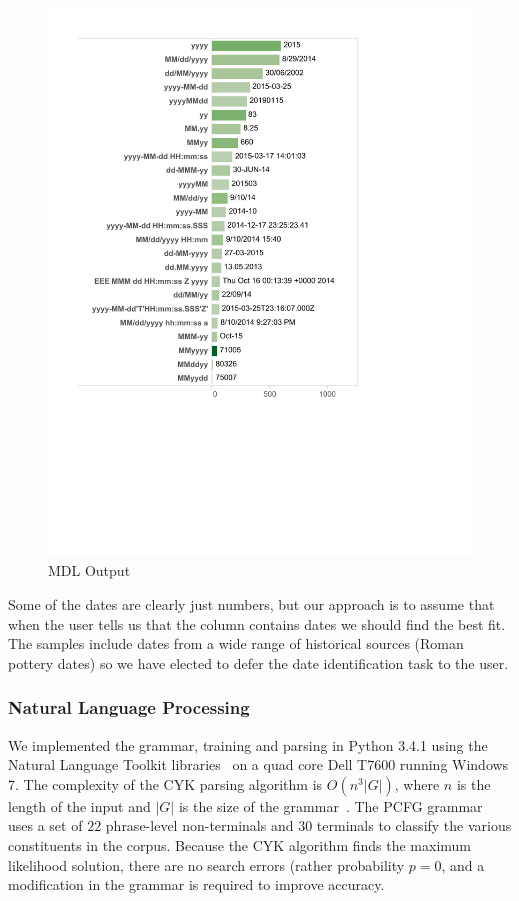\begin{figure}[ht]
\centering
\includegraphics[width=\columnwidth]{figures/FigureM3}
\caption{MDL Output}
\label{fig:M3}
\end{figure}


Some of the dates are clearly just numbers, but our approach is to assume that when the user tells us that the column contains dates we should find the best fit. The samples include dates from a wide range of historical sources (\eg Roman pottery dates) so we have elected to defer the date identification task to the user.

\subsubsection{Natural Language Processing}


We implemented the grammar, training and parsing in Python 3.4.1 using the Natural Language Toolkit libraries~\cite{nltk} on a quad core Dell T7600 running Windows 7. The complexity of the CYK parsing algorithm is $O(n^{3}|G|)$, where $n$ is the length of the input and $|G|$ is the size of the grammar~\cite{Younger67}. The PCFG grammar uses a set of $22$ phrase-level non-terminals and $30$ terminals to classify the various constituents in the corpus. Because the CYK algorithm finds the maximum likelihood solution, there are no search errors (rather probability $p = 0$, and a modification in the grammar is required to improve accuracy.

